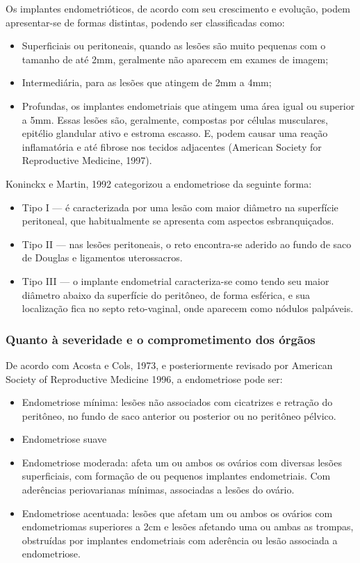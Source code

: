 \documentclass[12pt]{article} %
\begin{document}
Os implantes endometrióticos, de acordo com seu crescimento e evolução,
podem apresentar-se de formas distintas, podendo ser classificadas
como:
\begin{itemize}

\item Superficiais ou peritoneais, quando as lesões são muito pequenas
com o tamanho de até 2mm, geralmente não aparecem em exames de imagem;
\item Intermediária, para as lesões que atingem de 2mm a 4mm; 
\item Profundas, os implantes endometriais que atingem uma área igual ou superior a 5mm.
Essas lesões são, geralmente, compostas por células musculares,
epitélio glandular ativo e estroma escasso. E, podem causar uma reação
inflamatória e até fibrose nos tecidos adjacentes (American Society
for Reproductive Medicine, 1997).
\end{itemize}

Koninckx e Martin, 1992 categorizou a endometriose da seguinte forma:

\begin{itemize}
\item Tipo I --- é caracterizada por uma lesão com maior diâmetro na
  superfície peritoneal, que habitualmente se apresenta com aspectos
  esbranquiçados.
\item Tipo II --- nas lesões peritoneais, o reto encontra-se aderido ao
  fundo de saco de Douglas e ligamentos uterossacros.
\item Tipo III --- o implante endometrial caracteriza-se como tendo
  seu maior diâmetro abaixo da superfície do peritôneo, de forma
  esférica, e sua localização fica no septo reto-vaginal, onde
  aparecem como nódulos palpáveis.
\end{itemize}

\subsubsection{Quanto à severidade e o comprometimento dos órgãos}

De acordo com Acosta e Cols, 1973, e posteriormente revisado por American Society of Reproductive Medicine 1996, a endometriose pode ser:


\begin{itemize}
\item Endometriose mínima: lesões não associados com cicatrizes e
  retração do peritôneo, no fundo de saco anterior ou posterior ou no
  peritôneo pélvico.
\item Endometriose suave
\item Endometriose moderada: afeta um ou ambos os ovários com diversas
  lesões superficiais, com formação de  ou pequenos
  implantes endometriais. Com aderências periovarianas mínimas,
  associadas a lesões do ovário.
\item Endometriose acentuada: lesões que afetam um ou ambos os ovários
  com endometriomas superiores a 2cm e lesões afetando uma ou ambas as
  trompas, obstruídas por implantes endometriais com aderência ou
  lesão associada a endometriose.
\end{itemize}
\end{document}
